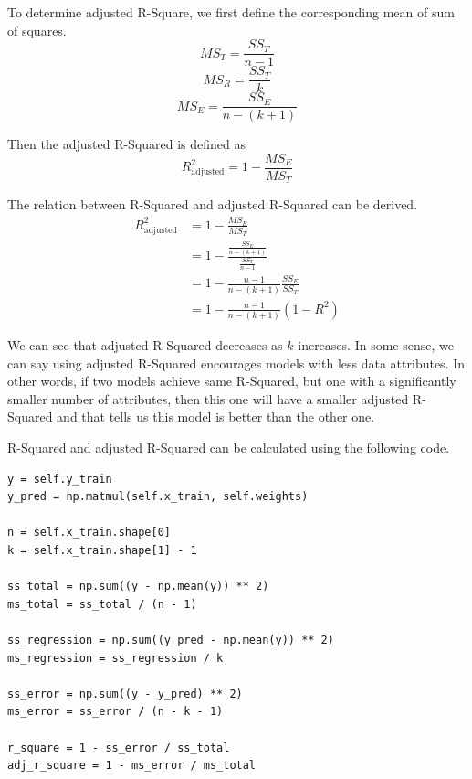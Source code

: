 \documentclass[
	letterpaper
]{article}
\begin{document}
To determine adjusted R-Square, we first define the corresponding mean of sum of squares.
\begin{equation}
MS_T = \frac{SS_T}{n-1}
\end{equation}
\begin{equation}
MS_R = \frac{SS_T}{k}
\end{equation}
\begin{equation}
MS_E = \frac{SS_E}{n-(k+1)}
\end{equation}

Then the adjusted R-Squared is defined as
\begin{equation}
R_{\text{adjusted}}^2 = 1 - \frac{MS_E}{MS_T}
\end{equation}

The relation between R-Squared and adjusted R-Squared can be derived.
\begin{equation}
\begin{split}
R_{\text{adjusted}}^2 &= 1 - \frac{MS_E}{MS_T}\\
& =  1 - \frac{\frac{SS_E}{n-(k+1)}}{\frac{SS_T}{n-1}}\\
& = 1 - \frac{n-1}{n-(k+1)} \frac{SS_E}{SS_T}\\
& = 1 - \frac{n-1}{n-(k+1)} (1-R^2)
\end{split}
\end{equation}

We can see that adjusted R-Squared decreases as $k$ increases.
In some sense, we can say using adjusted R-Squared encourages models with less data attributes.
In other words, if two models achieve same R-Squared, but one with a significantly smaller number of attributes, then this one will have a smaller adjusted R-Squared and that tells us this model is better than the other one.

R-Squared and adjusted R-Squared can be calculated using the following code.
\begin{lstlisting}
y = self.y_train
y_pred = np.matmul(self.x_train, self.weights)

n = self.x_train.shape[0]
k = self.x_train.shape[1] - 1

ss_total = np.sum((y - np.mean(y)) ** 2)
ms_total = ss_total / (n - 1)

ss_regression = np.sum((y_pred - np.mean(y)) ** 2)
ms_regression = ss_regression / k

ss_error = np.sum((y - y_pred) ** 2)
ms_error = ss_error / (n - k - 1)

r_square = 1 - ss_error / ss_total
adj_r_square = 1 - ms_error / ms_total
\end{lstlisting}
\end{document}
